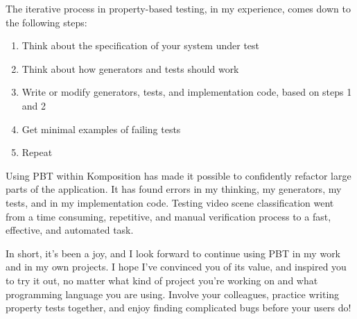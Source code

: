 The iterative process in property-based testing, in my experience, comes down to the following steps:

\begin{enumerate}
\item Think about the specification of your system under test
\item Think about how generators and tests should work
\item Write or modify generators, tests, and implementation code, based on steps 1 and 2
\item Get minimal examples of failing tests
\item Repeat
\end{enumerate}
Using PBT within Komposition has made it possible to confidently refactor large parts of the application. It has found errors in my thinking, my generators, my tests, and in my implementation code. Testing video scene classification went from a time consuming, repetitive, and manual verification process to a fast, effective, and automated task.

In short, it's been a joy, and I look forward to continue using PBT in my work and in my own projects. I hope I've convinced you of its value, and inspired you to try it out, no matter what kind of project you're working on and what programming language you are using. Involve your colleagues, practice writing property tests together, and enjoy finding complicated bugs before your users do!
